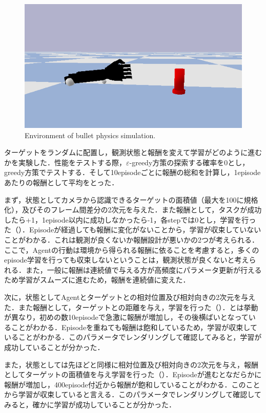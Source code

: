 \begin{figure}
    \centering
    \includegraphics[width=0.7\linewidth]{figure/chapter3/bullet_demo}
    \caption{Environment of bullet physics simulation.}
    \label{fig:1号機simu}
\end{figure}


ターゲットをランダムに配置し，観測状態と報酬を変えて学習がどのように進むかを実験した．性能をテストする際，$\varepsilon$-greedy方策の探索する確率を0とし，greedy方策でテストする．そして10episodeごとに報酬の総和を計算し，1episodeあたりの報酬として平均をとった．

まず，状態としてカメラから認識できるターゲットの面積値（最大を100に規格化），及びそのフレーム間差分の2次元を与えた．また報酬として，タスクが成功したら+1，1episode以内に成功しなかったら-1，各stepでは0とし，学習を行った（）．Episodeが経過しても報酬に変化がないことから，学習が収束していないことがわかる．これは観測が良くないか報酬設計が悪いかの2つが考えられる．ここで，Agentの行動は環境から得られる報酬に依ることを考慮すると，多くのepisode学習を行っても収束しないということは，観測状態が良くないと考えられる．また，一般に報酬は連続値で与える方が高頻度にパラメータ更新が行えるため学習がスムーズに進むため，報酬を連続値に変えた．

次に，状態としてAgentとターゲットとの相対位置及び相対向きの2次元を与えた．また報酬として，ターゲットとの距離を与え，学習を行った（）．とは挙動が異なり，初めの数10episodeで急激に報酬が増加し，その後横ばいとなっていることがわかる．Episodeを重ねても報酬は飽和しているため，学習が収束していることがわかる．このパラメータでレンダリングして確認してみると，学習が成功していることが分かった．

また，状態としては先ほどと同様に相対位置及び相対向きの2次元を与え，報酬としてターゲットの面積値を与え学習を行った（）．Episodeが進むとなだらかに報酬が増加し，400episode付近から報酬が飽和していることがわかる．このことから学習が収束していると言える．このパラメータでレンダリングして確認してみると，確かに学習が成功していることが分かった．


